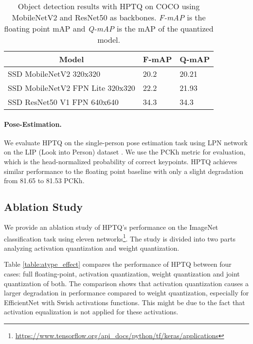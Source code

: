 \documentclass{article}
\newcommand{\mbvtwo}{MobileNetV2 \cite{sandler2018mobilenetv2} }
\newcommand{\res}{ResNet50 \cite{he2016deep} }
\begin{document}
\begin{table}[H]
\centering
\caption{Object detection results with HPTQ on COCO  \cite{lin2014microsoft} using \mbvtwo and \res as backbones. \textit{F-mAP} is the floating point mAP  and \textit{Q-mAP} is the mAP of the quantized model.}
\label{table:det}
\begin{tabular}{|l|l|l|}
\hline
\multicolumn{1}{|c|}{\textbf{Model}}                           & \multicolumn{1}{|c|}{\textbf{F-mAP}} & \multicolumn{1}{|c|}{\textbf{Q-mAP}} \\ \hline
SSD \mbvtwo 320x320  & 20.2  & 20.21     \\ \hline
SSD  \mbvtwo FPN Lite 320x320        & 22.2  & 21.93     \\ \hline
SSD \res V1 FPN 640x640     & 34.3  & 34.3      \\ \hline
\end{tabular}
\end{table}





\paragraph{Pose-Estimation.} 
We evaluate HPTQ on the single-person pose estimation task using LPN network \cite{zhang2019simple} on the LIP (Look into Person) dataset \cite{liang2018look}. 
We use the PCKh metric \cite{liang2018look} for evaluation, which is the head-normalized probability of correct keypoints. 
HPTQ achieves similar performance to the floating point baseline with only a slight degradation from 81.65 to 81.53 PCKh.




\subsection{Ablation Study}\label{sec:ablation}

We provide an ablation study of HPTQ's performance on the ImageNet classification task \cite{deng2009imagenet} using eleven networks\footnote{\url{https://www.tensorflow.org/api_docs/python/tf/keras/applications}}. 
The study is divided into two parts analyzing activation quantization and weight quantization. 

Table \ref{table:atype_effect} compares the performance of HPTQ between four cases: full floating-point, activation quantization, weight quantization and joint quantization of both. 
The comparison shows that activation quantization causes a larger degradation in performance compared to weight quantization, especially for EfficientNet with Swish activations functions. 
This might be due to the fact that activation equalization is not applied for these activations.
\end{document}
